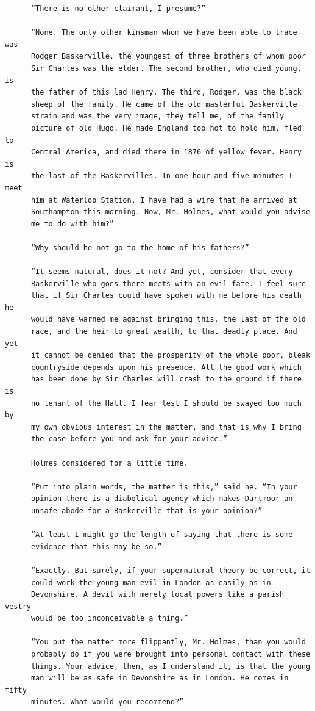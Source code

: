 \documentclass{article}
\begin{document}
\begin{verbatim}
      “There is no other claimant, I presume?”

      “None. The only other kinsman whom we have been able to trace was
      Rodger Baskerville, the youngest of three brothers of whom poor
      Sir Charles was the elder. The second brother, who died young, is
      the father of this lad Henry. The third, Rodger, was the black
      sheep of the family. He came of the old masterful Baskerville
      strain and was the very image, they tell me, of the family
      picture of old Hugo. He made England too hot to hold him, fled to
      Central America, and died there in 1876 of yellow fever. Henry is
      the last of the Baskervilles. In one hour and five minutes I meet
      him at Waterloo Station. I have had a wire that he arrived at
      Southampton this morning. Now, Mr. Holmes, what would you advise
      me to do with him?”

      “Why should he not go to the home of his fathers?”

      “It seems natural, does it not? And yet, consider that every
      Baskerville who goes there meets with an evil fate. I feel sure
      that if Sir Charles could have spoken with me before his death he
      would have warned me against bringing this, the last of the old
      race, and the heir to great wealth, to that deadly place. And yet
      it cannot be denied that the prosperity of the whole poor, bleak
      countryside depends upon his presence. All the good work which
      has been done by Sir Charles will crash to the ground if there is
      no tenant of the Hall. I fear lest I should be swayed too much by
      my own obvious interest in the matter, and that is why I bring
      the case before you and ask for your advice.”

      Holmes considered for a little time.

      “Put into plain words, the matter is this,” said he. “In your
      opinion there is a diabolical agency which makes Dartmoor an
      unsafe abode for a Baskerville—that is your opinion?”

      “At least I might go the length of saying that there is some
      evidence that this may be so.”

      “Exactly. But surely, if your supernatural theory be correct, it
      could work the young man evil in London as easily as in
      Devonshire. A devil with merely local powers like a parish vestry
      would be too inconceivable a thing.”

      “You put the matter more flippantly, Mr. Holmes, than you would
      probably do if you were brought into personal contact with these
      things. Your advice, then, as I understand it, is that the young
      man will be as safe in Devonshire as in London. He comes in fifty
      minutes. What would you recommend?”


\end{verbatim}
\end{document}
